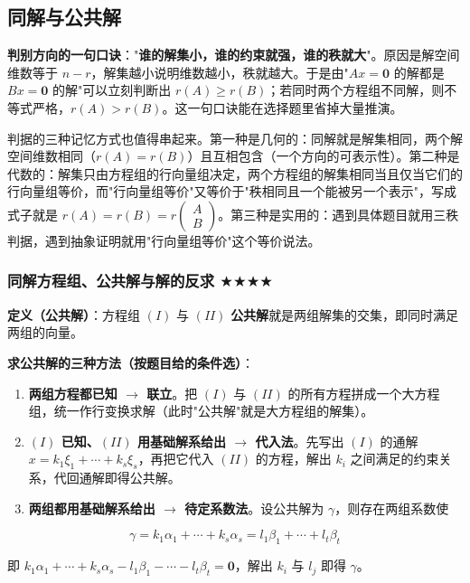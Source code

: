 \documentclass[11pt,openany,UTF8]{ctexbook}
\begin{document}
\subsection{同解与公共解}

\textbf{判别方向的一句口诀}："\textbf{谁的解集小，谁的约束就强，谁的秩就大}"。原因是解空间维数等于 $n-r$，解集越小说明维数越小，秩就越大。于是由"$Ax=\mathbf{0}$ 的解都是 $Bx=\mathbf{0}$ 的解"可以立刻判断出 $r(A)\ge r(B)$；若同时两个方程组不同解，则不等式严格，$r(A)>r(B)$。这一句口诀能在选择题里省掉大量推演。

判据的三种记忆方式也值得串起来。第一种是几何的：同解就是解集相同，两个解空间维数相同（$r(A)=r(B)$）且互相包含（一个方向的可表示性）。第二种是代数的：解集只由方程组的行向量组决定，两个方程组的解集相同当且仅当它们的行向量组等价，而"行向量组等价"又等价于"秩相同且一个能被另一个表示"，写成式子就是 $r(A)=r(B)=r\begin{pmatrix}A\\B\end{pmatrix}$。第三种是实用的：遇到具体题目就用三秩判据，遇到抽象证明就用"行向量组等价"这个等价说法。

\subsubsection{同解方程组、公共解与解的反求 $\bigstar$$\bigstar$$\bigstar$$\bigstar$}

\textbf{定义（公共解）}：方程组 $(I)$ 与 $(II)$ \textbf{公共解}就是两组解集的交集，即同时满足两组的向量。

\textbf{求公共解的三种方法（按题目给的条件选）}：

\begin{enumerate}
\item \textbf{两组方程都已知 $\to$ 联立}。把 $(I)$ 与 $(II)$ 的所有方程拼成一个大方程组，统一作行变换求解（此时"公共解"就是大方程组的解集）。
\item \textbf{$(I)$ 已知、$(II)$ 用基础解系给出 $\to$ 代入法}。先写出 $(I)$ 的通解 $x=k_1\xi_1+\cdots+k_s\xi_s$，再把它代入 $(II)$ 的方程，解出 $k_i$ 之间满足的约束关系，代回通解即得公共解。
\item \textbf{两组都用基础解系给出 $\to$ 待定系数法}。设公共解为 $\gamma$，则存在两组系数使
\end{enumerate}
\[\gamma=k_1\alpha_1+\cdots+k_s\alpha_s=l_1\beta_1+\cdots+l_t\beta_t\]

即 $k_1\alpha_1+\cdots+k_s\alpha_s-l_1\beta_1-\cdots-l_t\beta_t=\mathbf{0}$，解出 $k_i$ 与 $l_j$ 即得 $\gamma$。
\end{document}
